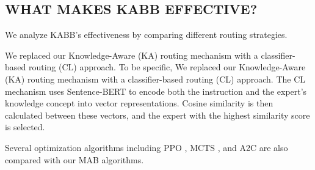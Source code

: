 \subsection{WHAT MAKES KABB EFFECTIVE?}
We analyze KABB's effectiveness by comparing different routing strategies. 

We replaced our Knowledge-Aware (KA) routing mechanism with a classifier-based routing (CL) approach. To be specific, We replaced our Knowledge-Aware (KA) routing mechanism with a classifier-based routing (CL) approach. The CL mechanism uses Sentence-BERT to encode both the instruction and the expert’s knowledge concept into vector representations. Cosine similarity is then calculated between these vectors, and the expert with the highest similarity score is selected. 

Several optimization algorithms including PPO \cite{schulman2017proximalpolicyoptimizationalgorithms}, MCTS \cite{_wiechowski_2022}, and A2C \cite{DBLP:journals/corr/MnihBMGLHSK16} are also compared with our MAB algorithms. 

